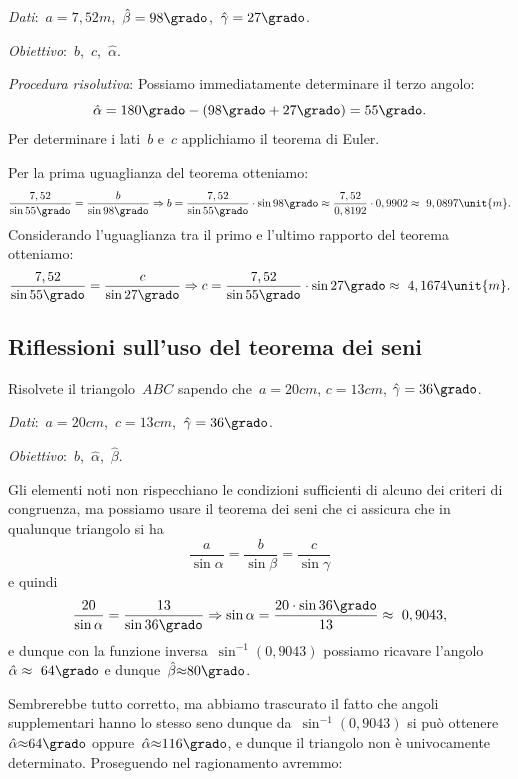 \emph{Dati}:~\(a= 
7,52\unit{m}\),\quad~\(\hat{\beta}=98\grado\),\quad~\({\hat{\gamma}}=27\grado\).

\emph{Obiettivo}:~\(b\),\quad~\(c\),\quad~\(\hat{\alpha}\).

\emph{Procedura risolutiva}:
Possiamo immediatamente determinare il terzo angolo: 
\[{\hat{\alpha}}=180\grado-(98\grado+27\grado)=55\grado.\]
Per determinare i lati~\(b\) e~\(c\) applichiamo il teorema di Euler.

Per la prima uguaglianza del teorema otteniamo:
\[
\frac{7,52}{\sin 55\grado}=\frac{b}{\sin 98\grado} \Rightarrow 
b=\frac{7,52}{\sin 55\grado}\cdot \sin 98\grado\approx
\frac{7,52}{0,8192}\cdot 0,9902\approx~9,0897\unit{m}.
\]
Considerando l'uguaglianza tra il primo e l'ultimo rapporto del teorema 
otteniamo:
\[
\frac{7,52}{\sin 55\grado}=\frac{c}{\sin 27\grado} \Rightarrow 
c=\frac{7,52}{\sin 55\grado}\cdot \sin 27\grado\approx~4,1674\unit{m}.
\]
\subsection{Riflessioni sull'uso del teorema dei seni}
\begin{problema}
Risolvete il triangolo~\(ABC\) sapendo che~\(a= 20\unit{cm}\), \(c= 13\unit{cm}\), 
\({\hat{\gamma}}=36\grado\).
\end{problema}

\emph{Dati}:~\(a= 20\unit{cm}\),\quad~\(c= 
13\unit{cm}\),\quad~\({\hat{\gamma}}=36\grado\).

\emph{Obiettivo}:~\(b\),\quad~\(\hat{\alpha}\),\quad~\(\hat{\beta}\).

Gli elementi noti non rispecchiano le condizioni sufficienti di alcuno dei 
criteri di congruenza, ma possiamo usare il teorema dei seni
che ci assicura che in qualunque triangolo si ha
 \[\frac{a}{\sin \alpha}=\frac{b}{\sin \beta}=\frac{c}{\sin \gamma}\]
e quindi
\[\frac{20}{\sin \alpha}=\frac{13}{\sin 36\grado}\Rightarrow\sin 
\alpha=\frac{20\cdot\sin 36\grado}{13}\approx~0,9043,\]
e dunque con la funzione inversa~\(\sin^{-1}(0,9043)\) possiamo ricavare 
l'angolo~\({\hat{\alpha}}\approx~64\grado\) e 
dunque~\({\hat{\beta}}{\approx}80\grado\).

Sembrerebbe tutto corretto, ma abbiamo trascurato il fatto che angoli 
supplementari hanno lo stesso seno dunque
da~\(\sin ^{-1}(0,9043)\) si può ottenere~\({\hat{\alpha}}{\approx} 64\grado\) 
oppure~\({\hat{\alpha}}{\approx}116\grado\),
e dunque il triangolo non è univocamente determinato. Proseguendo nel 
ragionamento avremmo:

